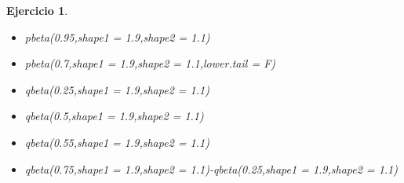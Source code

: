 \documentclass[11pt, a4paper]{article}
\newif\IfInSansMode
\theoremstyle{theorem-style}
\theoremstyle{definition-style}
\newtheorem{ejer}{Ejercicio}[section]
\theoremstyle{remark-style}
\theoremstyle{example-style}
\begin{document}
\begin{ejer}
\begin{enumerate}
\begin{itemize}
			\item pbeta(0.95,shape1 = 1.9,shape2 = 1.1)
			
			\item pbeta(0.7,shape1 = 1.9,shape2 = 1.1,lower.tail = F)
			
			\item qbeta(0.25,shape1 = 1.9,shape2 = 1.1)
			
			\item qbeta(0.5,shape1 = 1.9,shape2 = 1.1)
			
			\item qbeta(0.55,shape1 = 1.9,shape2 = 1.1)
			
			\item qbeta(0.75,shape1 = 1.9,shape2 = 1.1)-qbeta(0.25,shape1 = 1.9,shape2 = 1.1) \\ 
		\end{itemize}
	
\end{enumerate}




\end{ejer}
\end{document}
